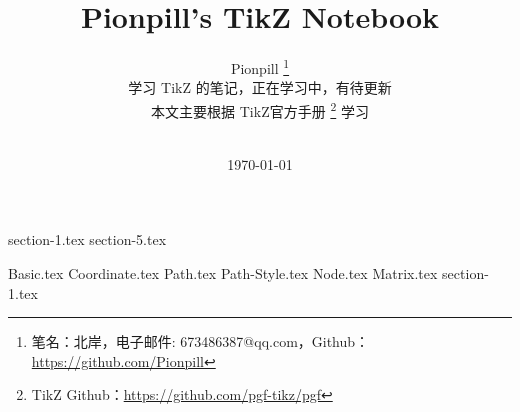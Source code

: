\documentclass{PionpillNote-book}
\title{Pionpill's TikZ Notebook}
\author{
    Pionpill
    \footnote{笔名：北岸，电子邮件: 673486387@qq.com，Github：\url{https://github.com/Pionpill}}\\[2ex]
    学习 TikZ 的笔记，正在学习中，有待更新 \\
    本文主要根据 TikZ官方手册 \footnote{TikZ Github：\url{https://github.com/pgf-tikz/pgf}}  学习
    
    \\[2ex]
}
\date{\today}
\begin{document}
\maketitle                  %
\tableofcontents            %
\thispagestyle{empty}
\newpage
\setcounter{page}{1}


{section-1.tex}
{section-5.tex}

{Basic.tex}
{Coordinate.tex}
{Path.tex}
{Path-Style.tex}
{Node.tex}
{Matrix.tex}
{section-1.tex}

















\end{document}
